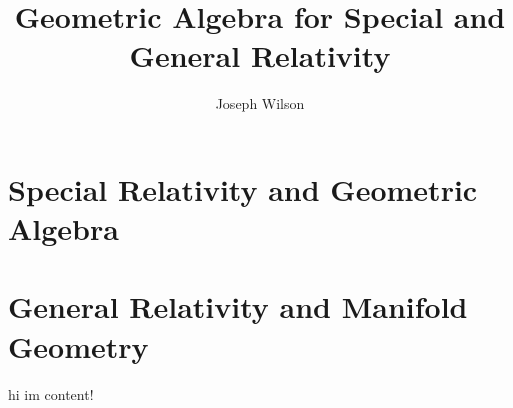 \newif\ifdebug
\newif\iffinal





\title{Geometric Algebra for Special and General Relativity}
\author{Joseph Wilson}





	\maketitle
	\tableofcontents

\restoregeometry %

\ifdebug
	
\fi





\part{Special Relativity and Geometric Algebra}
\label{part:1}







\part{General Relativity and Manifold Geometry}
\label{part:2}

hi im content!








